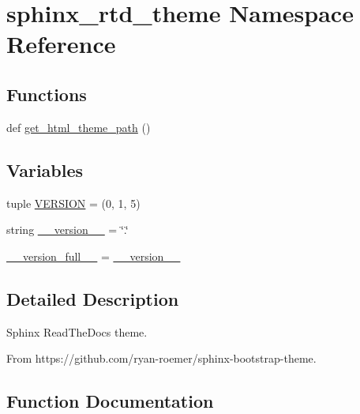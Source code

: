 \hypertarget{namespacesphinx__rtd__theme}{}\section{sphinx\+\_\+rtd\+\_\+theme Namespace Reference}
\label{namespacesphinx__rtd__theme}
\subsection*{Functions}
\begin{DoxyCompactItemize}
\item 
def \hyperlink{namespacesphinx__rtd__theme_acbc9811b34dcf9fe9138539ce54d85ae}{get\+\_\+html\+\_\+theme\+\_\+path} ()
\end{DoxyCompactItemize}
\subsection*{Variables}
\begin{DoxyCompactItemize}
\item 
tuple \hyperlink{namespacesphinx__rtd__theme_a186dfc24f89ce6dee4a9f0592eef9514}{V\+E\+R\+S\+I\+O\+N} = (0, 1, 5)
\item 
string \hyperlink{namespacesphinx__rtd__theme_a4ab58d4bcf214e227cb35538617e6add}{\+\_\+\+\_\+version\+\_\+\+\_\+} = \char`\"{}.\char`\"{}
\item 
\hyperlink{namespacesphinx__rtd__theme_a4b0924f8d5159608b138c81e849d7dc9}{\+\_\+\+\_\+version\+\_\+full\+\_\+\+\_\+} = \hyperlink{namespacesphinx__rtd__theme_a4ab58d4bcf214e227cb35538617e6add}{\+\_\+\+\_\+version\+\_\+\+\_\+}
\end{DoxyCompactItemize}


\subsection{Detailed Description}
\begin{DoxyVerb}Sphinx ReadTheDocs theme.

From https://github.com/ryan-roemer/sphinx-bootstrap-theme.\end{DoxyVerb}
 

\subsection{Function Documentation}
\hypertarget{namespacesphinx__rtd__theme_acbc9811b34dcf9fe9138539ce54d85ae}{}
